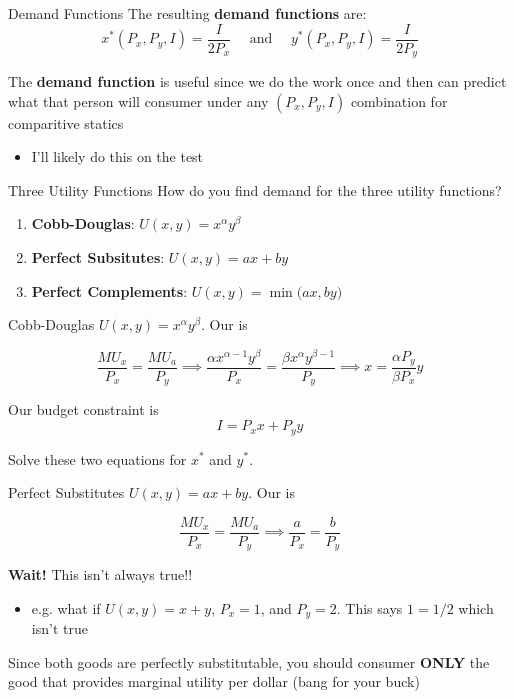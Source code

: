\documentclass[11pt,t]{beamer}
\begin{document}
\begin{frame}{Demand Functions}
  The resulting \textbf{demand functions} are:
  $$
    x^*(P_x, P_y, I) =  \frac{I}{2P_x} 
    \quad\text{ and }\quad
    y^*(P_x, P_y, I) = \frac{I}{2P_y}
  $$

  \pause\bigskip
  The \textbf{demand function} is useful since we do the work once and then can predict what that person will consumer under any $(P_x, P_y, I)$ combination for comparitive statics
  \begin{itemize}
    \item I'll likely do this on the test
  \end{itemize}
\end{frame}

\begin{frame}{Three Utility Functions}
  How do you find demand for the three utility functions?
  \begin{enumerate}
    \item \textbf{Cobb-Douglas}: $U(x,y) = x^\alpha y^\beta$
    
    \vspace{1.4cm}
    \item \textbf{Perfect Subsitutes}: $U(x,y) = ax + by$
    
    \vspace{1.4cm}
    \item \textbf{Perfect Complements}: $U(x,y) = \min\big(ax, by\big)$
  \end{enumerate}
\end{frame}

\begin{frame}{Cobb-Douglas}
  $U(x,y) = x^\alpha y^\beta$. Our  is 
  
  $$
    \frac{MU_x}{P_x} = \frac{MU_a}{P_y} 
    \implies \frac{\alpha x^{\alpha - 1} y^{\beta}}{P_x} = \frac{\beta x^{\alpha} y^{\beta - 1}}{P_y} 
    \implies x = \frac{\alpha P_y}{\beta P_x} y
  $$

  \bigskip
  Our budget constraint is 
  $$
    I = P_x x + P_y y
  $$

  \bigskip
  Solve these two equations for $x^*$ and $y^*$.
\end{frame}

\begin{frame}{Perfect Substitutes}
  $U(x,y) = ax + by$. Our  is

  $$
    \frac{MU_x}{P_x} = \frac{MU_a}{P_y} \implies \frac{a}{P_x} = \frac{b}{P_y}
  $$

  \pause\bigskip
  \textbf{Wait!} This isn't always true!!
  \begin{itemize}
    \item e.g. what if $U(x,y) = x + y$, $P_x = 1$, and $P_y = 2$. This says $1 = 1/2$ which isn't true
  \end{itemize} 

  \pause\bigskip
  Since both goods are perfectly substitutable, you should consumer \textbf{ONLY} the good that provides marginal utility per dollar (bang for your buck)
\end{frame}
\end{document}
